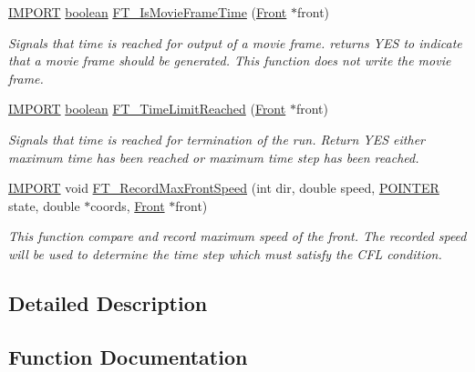 \begin{DoxyCompactItemize}
\hyperlink{cdecs_8h_a773175d74e73776d69c3e538f17de1ee}{I\+M\+P\+O\+RT} \hyperlink{cdecs_8h_ad048433382a936258fb49e2ec4f148e1}{boolean} \hyperlink{group___t_i_m_e_gaefbf5f750cbf1d02b7e1e15fb76954e9}{F\+T\+\_\+\+Is\+Movie\+Frame\+Time} (\hyperlink{fdecs_8h_ac32202b798f848095c489cfd04c4ca5f}{Front} $\ast$front)
\begin{DoxyCompactList}\small\item\em Signals that time is reached for output of a movie frame. returns Y\+ES to indicate that a movie frame should be generated. This function does not write the movie frame. \end{DoxyCompactList}\item 
\hyperlink{cdecs_8h_a773175d74e73776d69c3e538f17de1ee}{I\+M\+P\+O\+RT} \hyperlink{cdecs_8h_ad048433382a936258fb49e2ec4f148e1}{boolean} \hyperlink{group___t_i_m_e_ga869ebe5c3c2fbd15767e266febe88e46}{F\+T\+\_\+\+Time\+Limit\+Reached} (\hyperlink{fdecs_8h_ac32202b798f848095c489cfd04c4ca5f}{Front} $\ast$front)
\begin{DoxyCompactList}\small\item\em Signals that time is reached for termination of the run. Return Y\+ES either maximum time has been reached or maximum time step has been reached. \end{DoxyCompactList}\item 
\hyperlink{cdecs_8h_a773175d74e73776d69c3e538f17de1ee}{I\+M\+P\+O\+RT} void \hyperlink{group___t_i_m_e_ga9f007ed6e3de95b1e56c8f925b740a0c}{F\+T\+\_\+\+Record\+Max\+Front\+Speed} (int dir, double speed, \hyperlink{cdecs_8h_ae51a81000f343b8ec43bca1f6a723d7b}{P\+O\+I\+N\+T\+ER} state, double $\ast$coords, \hyperlink{fdecs_8h_ac32202b798f848095c489cfd04c4ca5f}{Front} $\ast$front)
\begin{DoxyCompactList}\small\item\em This function compare and record maximum speed of the front. The recorded speed will be used to determine the time step which must satisfy the C\+FL condition. \end{DoxyCompactList}\end{DoxyCompactItemize}


\subsection{Detailed Description}


\subsection{Function Documentation}
